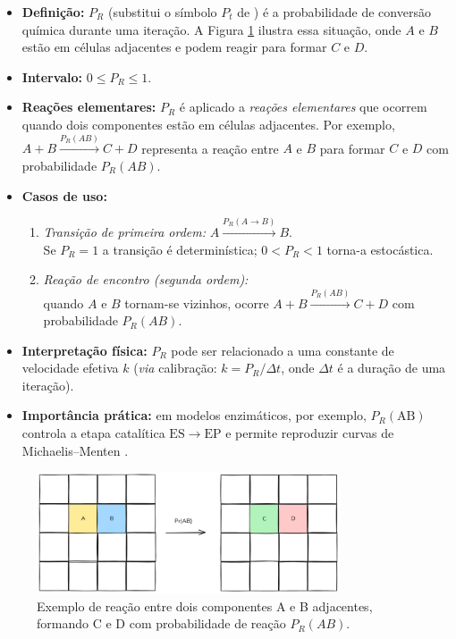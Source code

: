 \documentclass[12pt,oneside]{report}
\begin{document}
\begin{itemize}
    \item \textbf{Definição:} $P_R$ (substitui o símbolo $P_t$ de
          \citeauthor{kier2005}) é a probabilidade de conversão química
          durante uma iteração. A Figura \ref{fig:reacao} ilustra essa situação, onde $A$ e $B$ estão em células adjacentes e podem reagir para formar $C$ e $D$.
    \item \textbf{Intervalo:} $0 \le P_R \le 1$.
    \item \textbf{Reações elementares:} $P_R$ é aplicado a
          \emph{reações elementares} que ocorrem quando
          dois componentes estão em células adjacentes.
          Por exemplo, $A+B \xrightarrow{P_R(AB)} C+D$
          representa a reação entre $A$ e $B$ para formar $C$ e $D$ com probabilidade $P_R(AB)$.
    \item \textbf{Casos de uso:}
          \begin{enumerate}
              \item \emph{Transição de primeira ordem:}
                    $A \xrightarrow{P_R(A\rightarrow B)} B$.\\
                    Se $P_R=1$ a transição é determinística;
                    $0<P_R<1$ torna-a estocástica.
              \item \emph{Reação de encontro (segunda ordem):}\\
                    quando $A$ e $B$ tornam-se vizinhos,
                    ocorre $A+B \xrightarrow{P_R(AB)} C+D$
                    com probabilidade $P_R(AB)$.
          \end{enumerate}
    \item \textbf{Interpretação física:} $P_R$ pode ser relacionado a
          uma constante de velocidade efetiva $k$
          (\textit{via} calibração: $k = P_R/\Delta t$,
          onde $\Delta t$ é a duração de uma iteração).
    \item \textbf{Importância prática:}
          em modelos enzimáticos, por exemplo, $P_R(\mathrm{AB})$
          controla a etapa catalítica $\mathrm{ES}\rightarrow\mathrm{EP}$
          e permite reproduzir curvas de Michaelis–Menten
          \cite{kier2005}.
\end{itemize}

\begin{figure}[H]
    \centering
    \includegraphics[width=0.8\textwidth]{img/reacao.png}
    \caption{\small Exemplo de reação entre dois componentes A e B adjacentes, formando C e D com probabilidade de reação $P_R(AB)$.}
    \label{fig:reacao}
\end{figure}
\end{document}
